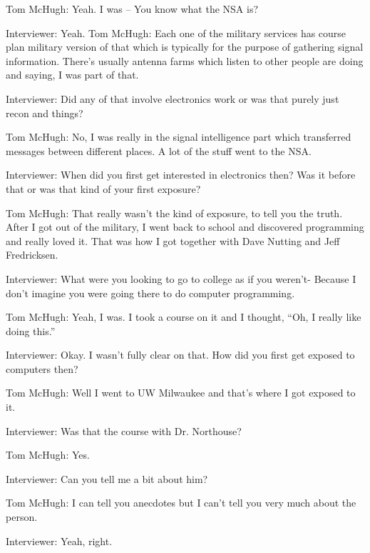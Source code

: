 \textcolor{interviewee}{Tom McHugh:} Yeah. I was – You know what the NSA is?

\textcolor{interviewer}{Interviewer:} Yeah.
\textcolor{interviewee}{Tom McHugh:} Each one of the military services has course plan military version of that which is typically for the purpose of gathering signal information. There’s usually antenna farms which listen to other people are doing and saying, I was part of that.

\textcolor{interviewer}{Interviewer:} Did any of that involve electronics work or was that purely just recon and things?

\textcolor{interviewee}{Tom McHugh:} No, I was really in the signal intelligence part which transferred messages between different places. A lot of the stuff went to the NSA.

\textcolor{interviewer}{Interviewer:} When did you first get interested in electronics then? Was it before that or was that kind of your first exposure?

\textcolor{interviewee}{Tom McHugh:} That really wasn’t the kind of exposure, to tell you the truth. After I got out of the military, I went back to school and discovered programming and really loved it. That was how I got together with Dave Nutting and Jeff Fredricksen.

\textcolor{interviewer}{Interviewer:} What were you looking to go to college as if you weren’t- Because I don’t imagine you were going there to do computer programming.

\textcolor{interviewee}{Tom McHugh:} Yeah, I was. I took a course on it and I thought, “Oh, I really like doing this.”

\textcolor{interviewer}{Interviewer:} Okay. I wasn’t fully clear on that. How did you first get exposed to computers then?

\textcolor{interviewee}{Tom McHugh:} Well I went to UW Milwaukee and that’s where I got exposed to it.

\textcolor{interviewer}{Interviewer:} Was that the course with Dr. Northouse?

\textcolor{interviewee}{Tom McHugh:} Yes.

\textcolor{interviewer}{Interviewer:} Can you tell me a bit about him?

\textcolor{interviewee}{Tom McHugh:} I can tell you anecdotes but I can’t tell you very much about the person.

\textcolor{interviewer}{Interviewer:} Yeah, right.


